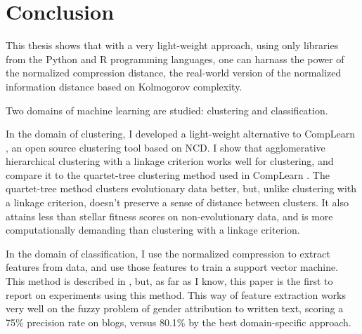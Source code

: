 
\chapter{Conclusion} %

\label{Conclusion} %


This thesis shows that with a very light-weight approach, using only libraries from the Python and R programming languages, one can harnass the power of the normalized compression distance, the real-world version of the normalized information distance based on Kolmogorov complexity.

Two domains of machine learning are studied: clustering and classification.

In the domain of clustering, I developed a light-weight alternative to CompLearn \cite{CompLearn}, an open source clustering tool based on NCD. I show that agglomerative hierarchical clustering with a linkage criterion works well for clustering, and compare it to the quartet-tree clustering method used in CompLearn \cite{Cilibrasi2011}. The quartet-tree method clusters evolutionary data better, but, unlike clustering with a linkage criterion, doesn't preserve a sense of distance between clusters. It also attains less than stellar fitness scores on non-evolutionary data, and is more computationally demanding than clustering with a linkage criterion.

In the domain of classification, I use the normalized compression to extract features from data, and use those features to train a support vector machine. This method is described in \cite{Cilibrasi2007}, but, as far as I know, this paper is the first to report on experiments using this method. This way of feature extraction works very well on the fuzzy problem of gender attribution to written text, scoring a 75\% precision rate on blogs, versus 80.1\% by the best domain-specific approach.
